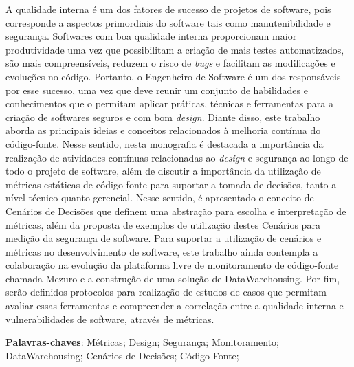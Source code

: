 \begin{resumo}

A qualidade interna é um dos fatores de sucesso de projetos de software, pois corresponde a aspectos primordiais do software tais como manutenibilidade e segurança. Softwares com boa qualidade interna proporcionam maior produtividade uma vez que possibilitam a criação de mais testes automatizados, são mais compreensíveis, reduzem o risco de \emph{bugs} e facilitam as modificações e evoluções no código. Portanto, o Engenheiro de Software é um dos responsáveis por esse sucesso, uma vez que deve reunir um conjunto de habilidades e conhecimentos que o permitam aplicar práticas, técnicas e ferramentas para a criação de softwares seguros e com bom \emph{design}. Diante disso, este trabalho aborda as principais ideias e conceitos relacionados à melhoria contínua do código-fonte. Nesse sentido, nesta monografia é destacada a importância da realização de atividades contínuas relacionadas ao \emph{design} e segurança ao longo de todo o projeto de software, além de discutir a importância da utilização de métricas estáticas de código-fonte para suportar a tomada de decisões, tanto a nível técnico quanto gerencial. Nesse sentido, é apresentado o conceito de Cenários de Decisões que definem uma abstração para escolha e interpretação de métricas, além da proposta de exemplos de utilização destes Cenários para medição da segurança de software. Para suportar a utilização de cenários e métricas no desenvolvimento de software, este trabalho ainda contempla a colaboração na evolução da plataforma livre de monitoramento de código-fonte chamada Mezuro e a construção de uma solução de DataWarehousing. Por fim, serão definidos protocolos para realização de estudos de casos que permitam avaliar essas ferramentas e compreender a correlação entre a qualidade interna e vulnerabilidades de software, através de métricas.

 \vspace{\onelineskip}
    
 \noindent
 \textbf{Palavras-chaves}: Métricas; Design; Segurança; Monitoramento; DataWarehousing; Cenários de Decisões; Código-Fonte;
\end{resumo}
